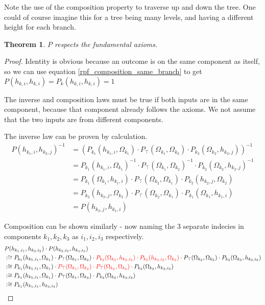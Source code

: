 \documentclass[twoside]{article}
\theoremstyle{plain}%
\newtheorem{theorem}{Theorem}[section]
\theoremstyle{definition}
\theoremstyle{remark}
\begin{document}
Note the use of the composition property to traverse up and down the tree. One could of course imagine this for a tree being many levels, and having a different height for each branch.

\begin{theorem}
\(P\) respects the fundamental axioms.
\end{theorem}

\begin{proof}
Identity is obvious because an outcome is on the same component as itself, so we can use equation \ref{rpf_composition_same_branch} to get \(P(h_{k, i}, h_{k, i}) = P_k(h_{k, i}, h_{k, i}) = 1\)

The inverse and composition laws must be true if both inputs are in the same component, because that component already follows the axioms. We not assume that the two inputs are from different components.

The inverse law can be proven by calculation.
\begin{equation}
\begin{aligned}
P(h_{k_1, i}, h_{k_2, j})^{-1} &= (P_{k_1}(h_{k_1, i}, \Omega_{k_1}) \cdot  P_{\top}(\Omega_{k_1}, \Omega_{k_2}) \cdot P_{k_2}(\Omega_{k_2}, h_{k_2, j}))^{-1} \\
& = P_{k_1}(h_{k_1, i}, \Omega_{k_1})^{-1} \cdot  P_{\top}(\Omega_{k_1}, \Omega_{k_2})^{-1} \cdot P_{k_2}(\Omega_{k_2}, h_{k_2, j})^{-1} \\
& = P_{k_1}(\Omega_{k_1}, h_{k_1, i}) \cdot  P_{\top}(\Omega_{k_2}, \Omega_{k_1}) \cdot P_{k_2}(h_{k_2, j}, \Omega_{k_2}) \\
& = P_{k_2}(h_{k_2, j}, \Omega_{k_2})\cdot  P_{\top}(\Omega_{k_2}, \Omega_{k_1}) \cdot P_{k_1}(\Omega_{k_1}, h_{k_1, i}) \\
& = P(h_{k_2, j}, h_{k_1, i})
\end{aligned}
\end{equation}

Composition can be shown similarly - now naming the 3 separate indecies in components \(k_1, k_2, k_3\) as \(i_1, i_2, i_3\) respectively.
\begin{equation}
\begin{aligned}
& P(h_{k_1, i_1}, h_{k_2, i_2}) \cdot P(h_{k_2, i_2}, h_{k_3, i_3}) \\
& :\cong P_{k_1}(h_{k_1, i_1}, \Omega_{k_1}) \cdot  P_{\top}(\Omega_{k_1}, \Omega_{k_2}) \cdot \textcolor{red}{P_{k_2}(\Omega_{k_2}, h_{k_2, i_2}) \cdot  P_{k_2}(h_{k_2, i_2}, \Omega_{k_2})} \cdot  P_{\top}(\Omega_{k_2}, \Omega_{k_3}) \cdot P_{k_3}(\Omega_{k_3}, h_{k_3, i_3}) \\
& :\cong P_{k_1}(h_{k_1, i_1}, \Omega_{k_1}) \cdot  \textcolor{red}{P_{\top}(\Omega_{k_1}, \Omega_{k_2}) \cdot  P_{\top}(\Omega_{k_2}, \Omega_{k_3})} \cdot P_{k_3}(\Omega_{k_3}, h_{k_3, i_3}) \\
& :\cong P_{k_1}(h_{k_1, i_1}, \Omega_{k_1}) \cdot  P_{\top}(\Omega_{k_1}, \Omega_{k_3}) \cdot P_{k_3}(\Omega_{k_3}, h_{k_3, i_3}) \\
& :\cong P_{k_1}(h_{k_1, i_1}, h_{k_3, i_3})
\end{aligned}
\end{equation}
\end{proof}
\end{document}
